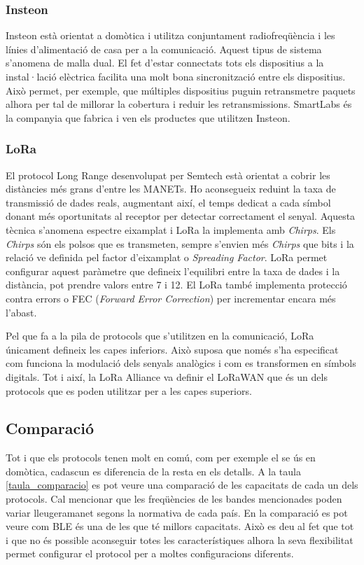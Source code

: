 \subsubsection{Insteon}
Insteon està orientat a domòtica i utilitza conjuntament radiofreqüència i les línies d'alimentació de casa per a la comunicació.
Aquest tipus de sistema s'anomena de malla dual.
El fet d'estar connectats tots els dispositius a la instal·lació elèctrica facilita una molt bona sincronització entre els dispositius.
Això permet, per exemple, que múltiples dispositius puguin retransmetre paquets alhora per tal de millorar la cobertura i reduir les retransmissions.
SmartLabs és la companyia que fabrica i ven els productes que utilitzen Insteon.

\subsubsection{LoRa}
El protocol Long Range desenvolupat per Semtech està orientat a cobrir les distàncies més grans d'entre les MANETs.
Ho aconsegueix reduint la taxa de transmissió de dades reals, augmentant així, el temps dedicat a cada símbol donant més oportunitats al receptor per detectar correctament el senyal.
Aquesta tècnica s'anomena espectre eixamplat i LoRa la implementa amb \textit{Chirps}.
Els \textit{Chirps} són els polsos que es transmeten, sempre s'envien més \textit{Chirps} que bits i la relació ve definida pel factor d'eixamplat o \textit{Spreading Factor}.
LoRa permet configurar aquest paràmetre que defineix l'equilibri entre la taxa de dades i la distància, pot prendre valors entre 7 i 12.
El LoRa també implementa protecció contra errors o FEC (\textit{Forward Error Correction}) per incrementar encara més l'abast.

Pel que fa a la pila de protocols que s'utilitzen en la comunicació, LoRa únicament defineix les capes inferiors.
Això suposa que només s'ha especificat com funciona la modulació dels senyals analògics i com es transformen en símbols digitals.
Tot i així, la LoRa Alliance va definir el LoRaWAN que és un dels protocols que es poden utilitzar per a les capes superiors.


\subsection{Comparació}
Tot i que els protocols tenen molt en comú, com per exemple el se ús en domòtica, cadascun es diferencia de la resta en els detalls.
A la taula \ref{taula_comparacio} es pot veure una comparació de les capacitats de cada un dels protocols.
Cal mencionar que les freqüències de les bandes mencionades poden variar lleugeramanet segons la normativa de cada país.
En la comparació es pot veure com BLE és una de les que té millors capacitats.
Això es deu al fet que tot i que no és possible aconseguir totes les característiques alhora la seva flexibilitat permet configurar el protocol per a moltes configuracions diferents.

